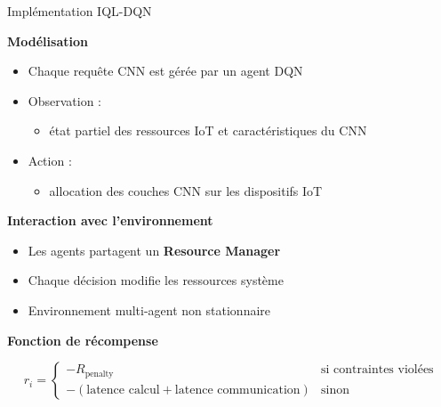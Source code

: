 \documentclass[aspectratio=169]{beamer}
\begin{document}
\begin{frame}{Implémentation IQL-DQN}

\textbf{Modélisation}

\begin{itemize}
  \item Chaque requête CNN est gérée par un agent DQN
  \item Observation :
  \begin{itemize}
    \item état partiel des ressources IoT et caractéristiques du CNN
  \end{itemize}
  \item Action :
  \begin{itemize}
    \item allocation des couches CNN sur les dispositifs IoT
  \end{itemize}
\end{itemize}

\bigskip

\textbf{Interaction avec l’environnement}

\begin{itemize}
  \item Les agents partagent un \textbf{Resource Manager}
  \item Chaque décision modifie les ressources système
  \item Environnement multi-agent non stationnaire
\end{itemize}

\bigskip

\textbf{Fonction de récompense}

\[
r_i =
\begin{cases}
- R_{\text{penalty}} & \text{si contraintes violées} \\
- (\text{latence calcul} + \text{latence communication}) & \text{sinon}
\end{cases}
\]

\end{frame}
\end{document}
